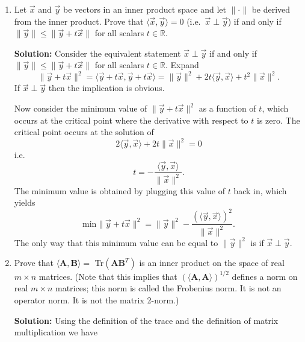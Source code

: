 \documentclass[11pt,fleqn]{article}
\begin{document}
\begin{enumerate}
\item Let $\vec{x}$ and $\vec{y}$ be vectors in an inner product space and let $\|\cdot\|$ be derived from the inner product. Prove that $\langle\vec{x},\vec{y}\rangle=0$ (i.e.\ $\vec{x}\perp\vec{y}$) if and only if $\|\vec{y}\|\le\|\vec{y}+t\vec{x}\|$ for all scalars $t\in\mathbb{R}$.

{\bf Solution:} Consider the equivalent statement $\vec{x}\perp\vec{y}$ if and only if $\|\vec{y}\|\le\|\vec{y}+t\vec{x}\|$ for all scalars $t\in\mathbb{R}$.
Expand
\[\|\vec{y}+t\vec{x}\|^2 = \langle\vec{y}+t\vec{x},\vec{y}+t\vec{x}\rangle = \|\vec{y}\|^2 + 2t\langle\vec{y},\vec{x}\rangle + t^2\|\vec{x}\|^2.\]
If $\vec{x}\perp\vec{y}$ then the implication is obvious.

Now consider the minimum value of $\|\vec{y}+t\vec{x}\|^2$ as a function of $t$, which occurs at the critical point where the derivative with respect to $t$ is zero.
The critical point occurs at the solution of
\[2\langle\vec{y},\vec{x}\rangle + 2t\|\vec{x}\|^2=0\]
i.e.
\[t = -\frac{\langle\vec{y},\vec{x}\rangle}{\|\vec{x}\|^2}.\]
The minimum value is obtained by plugging this value of $t$ back in, which yields
\[\text{min}\|\vec{y} + t\vec{x}\|^2 = \|\vec{y}\|^2 - \frac{(\langle\vec{y},\vec{x}\rangle)^2}{\|\vec{x}\|^2}.\]
The only way that this minimum value can be equal to $\|\vec{y}\|^2$ is if $\vec{x}\perp\vec{y}$.

\item Prove that $\langle\mathbf{A},\mathbf{B}\rangle=$ Tr$\left(\mathbf{AB}^T\right)$ is an inner product on the space of real $m\times n$ matrices. (Note that this implies that $(\langle\mathbf{A},\mathbf{A}\rangle)^{1/2}$ defines a norm on real $m\times n$ matrices; this norm is called the Frobenius norm. It is not an operator norm. It is not the matrix 2-norm.)

{\bf Solution:} Using the definition of the trace and the definition of matrix multiplication we have


\end{enumerate}
\end{document}

